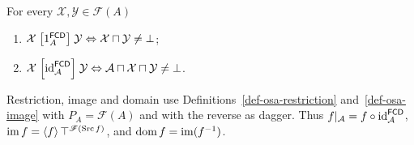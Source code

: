\begin{obvious}
For every $\mathcal{X},\mathcal{Y}\in\mathscr{F}(A)$
\begin{enumerate}
\item
$\mathcal{X}\mathrel{\left[1_{A}^{\mathsf{FCD}}\right]}\mathcal{Y}\Leftrightarrow\mathcal{X}
\sqcap\mathcal{Y}\ne\bot$;
\item
$\mathcal{X}\mathrel{\left[{\operatorname{id}}_{\mathcal{A}}^{\mathsf{FCD}}\right]}\mathcal{Y}
\Leftrightarrow\mathcal{A}\sqcap\mathcal{X}\sqcap\mathcal{Y}\ne\bot$.
\end{enumerate}
\end{obvious}
Restriction, image and domain use Definitions~\ref{def-osa-restriction}
and~\ref{def-osa-image} with $P_A=\mathscr F(A)$ and with the reverse
as dagger. Thus $f|_{\mathcal A}=f\circ{\operatorname{id}}_{\mathcal A}^{\mathsf{FCD}}$,
$\operatorname{im} f=\left\langle f\right\rangle\top^{\mathscr F(\operatorname{Src} f)}$, and
$\operatorname{dom} f=\operatorname{im}(f^{-1})$.

